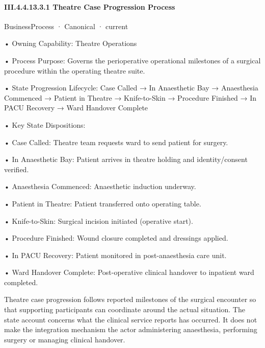 \paragraph*{III.4.4.13.3.1 Theatre Case Progression Process}
\label{navigation:III.4.4.13.3.1}

\label{element:8ad97120b5b54a31a64a4522e6bc9fd1}
{\small BusinessProcess · Canonical · current}\par

•
Owning Capability: Theatre Operations



•
Process Purpose: Governs the perioperative operational milestones of a surgical procedure within the operating theatre suite.



•
State Progression Lifecycle: Case Called → In Anaesthetic Bay → Anaesthesia Commenced → Patient in Theatre → Knife-to-Skin → Procedure Finished → In PACU Recovery → Ward Handover Complete



•
Key State Dispositions:



•
Case Called: Theatre team requests ward to send patient for surgery.



•
In Anaesthetic Bay: Patient arrives in theatre holding and identity/consent verified.



•
Anaesthesia Commenced: Anaesthetic induction underway.



•
Patient in Theatre: Patient transferred onto operating table.



•
Knife-to-Skin: Surgical incision initiated (operative start).



•
Procedure Finished: Wound closure completed and dressings applied.



•
In PACU Recovery: Patient monitored in post-anaesthesia care unit.



•
Ward Handover Complete: Post-operative clinical handover to inpatient ward completed.



Theatre case progression follows reported milestones of the surgical encounter so that supporting participants can coordinate around the actual situation. The state account concerns what the clinical service reports has occurred. It does not make the integration mechanism the actor administering anaesthesia, performing surgery or managing clinical handover.


